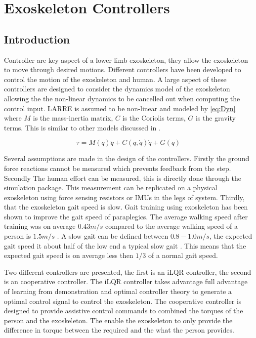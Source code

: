 \chapter{Exoskeleton Controllers}

\section{Introduction}

Controller are key aspect of a lower limb exoskeleton, they allow the exoskeleton to move through desired motions. Different controllers have been developed to control the motion of the exoskeleton and human. A large aspect of these controllers are designed to consider the dynamics model of the exoskeleton allowing the the non-linear dynamics to be cancelled out when computing the control input. LARRE is assumed to be non-linear and modeled by \autoref{eq:Dyn} where $M$ is the mass-inertia matrix, $C$ is the Coriolis terms, $G$ is the gravity terms. This is similar to other models discussed in \cite{huo2016active} \cite{vantilt2019model}.

\begin{equation}
    \tau = M(q) \ddot{q} + C(q, \dot{q}) \dot{q} + G(q)
    \label{eq:Dyn}
\end{equation}


Several assumptions are made in the design of the controllers. Firstly the ground force reactions cannot be measured which prevents feedback from the step. Secondly The human effort can be measured, this is directly done through the simulation package. This measurement can be replicated on a physical exoskeleton using force sensing resistors or IMUs in the legs of system. Thirdly, that the exoskeleton gait speed is slow. Gait training using exoskeleton has been shown to improve the gait speed of paraplegics. The average walking speed after training was on average $0.43m/s$ \cite{khan2019retraining} compared to the average walking speed of a person is $1.5m/s$ \cite{fitzpatrick2006another}. A slow gait can be defined between $0.8-1.0m/s$, the expected gait speed it about half of the low end a typical slow gait \cite{walsh2007quasi}. This means that the expected gait speed is on average less then $1/3$ of a normal gait speed. 

Two different controllers are presented, the first is an iLQR controller, the second is an cooperative controller. The iLQR controller takes advantage full advantage of learning from demonstration and optimal controller theory to generate a optimal control signal to control the exoskeleton. The cooperative controller is designed to provide assistive control commands to combined the torques of the person and the exoskeleton. The enable the exoskeleton to only provide the difference in torque between the required and the what the person provides. 

